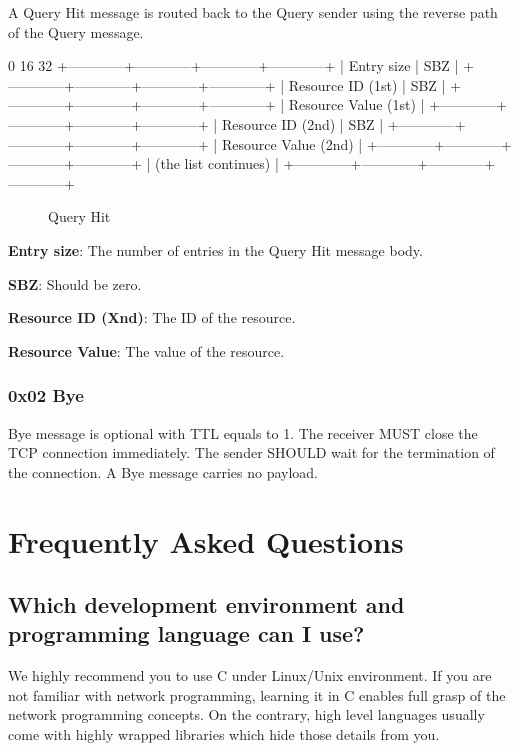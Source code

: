 \documentclass[12pt, a4paper]{article}
\begin{document}
A Query Hit message is routed back to the Query sender using the reverse path of the Query message.

\begin{verbbox}
0                          16                        32
+------------+------------+------------+------------+
|        Entry size       |           SBZ           |
+------------+------------+------------+------------+
|    Resource ID (1st)    |           SBZ           |
+------------+------------+------------+------------+
|                Resource Value (1st)               |
+------------+------------+------------+------------+
|    Resource ID (2nd)    |           SBZ           |
+------------+------------+------------+------------+
|                Resource Value (2nd)               |
+------------+------------+------------+------------+
|    (the list continues)                           |
+------------+------------+------------+------------+
\end{verbbox}
\begin{figure}[h!]
  \centering
  \theverbbox
  \label{queryhit}
  \caption{Query Hit}
\end{figure}

\textbf{Entry size}: The number of entries in the Query Hit message body.

\textbf{SBZ}: Should be zero.

\textbf{Resource ID (Xnd)}: The ID of the resource.

\textbf{Resource Value}: The value of the resource.

\subsubsection{0x02 Bye}
Bye message is optional with TTL equals to 1.
The receiver MUST close the TCP connection immediately.
The sender SHOULD wait for the termination of the connection.
A Bye message carries no payload.

\section{Frequently Asked Questions}
\subsection*{Which development environment and programming language can I use?}
We highly recommend you to use C under Linux/Unix environment.
If you are not familiar with network programming, learning it in C enables full grasp of the network programming concepts.
On the contrary, high level languages usually come with highly wrapped libraries which hide those details from you.
\end{document}
